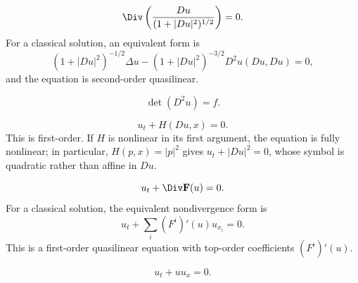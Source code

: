 \begin{example}
\label{ex:minimal-surface-equation}
\leanok
$$\Div\left(\frac{Du}{(1+|Du|^2)^{1/2}}\right) = 0.$$
For a classical solution, an equivalent form is
$$(1+|Du|^2)^{-1/2}\Delta u - (1+|Du|^2)^{-3/2}D^2u(Du,Du) = 0,$$
and the equation is second-order quasilinear.
\end{example}

\begin{example}
\label{ex:monge-ampere-equation}
\leanok
$$\det(D^2u) = f.$$
\end{example}

\begin{example}
\label{ex:hamilton-jacobi-equation}
\leanok
$$u_t + H(Du, x) = 0.$$
This is first-order. If $H$ is nonlinear in its first argument, the equation is
fully nonlinear; in particular, $H(p,x)=|p|^2$ gives $u_t+|Du|^2=0$, whose
symbol is quadratic rather than affine in $Du$.
\end{example}

\begin{example}
\label{ex:scalar-conservation-law}
\leanok
$$u_t + \Div\mathbf{F}(u) = 0.$$
For a classical solution, the equivalent nondivergence form is
$$u_t + \sum_i (F^i)'(u)u_{x_i} = 0.$$
This is a first-order quasilinear equation with top-order coefficients $(F^i)'(u)$.
\end{example}

\begin{example}
\label{ex:inviscid-burgers-equation}
\leanok
$$u_t + uu_x = 0.$$
\end{example}

